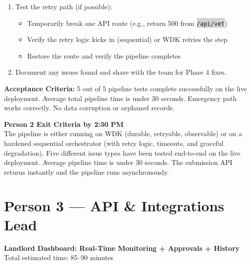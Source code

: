 \documentclass[11pt, a4paper]{article}
\newcommand{\code}[1]{\texttt{\small\colorbox{lightgray}{#1}}}
\begin{document}
\begin{enumerate}[leftmargin=2em, itemsep=2pt]
  \item Test the retry path (if possible):
    \begin{itemize}[itemsep=1pt]
      \item Temporarily break one API route (e.g., return 500 from \code{/api/vet})
      \item Verify the retry logic kicks in (sequential) or WDK retries the step
      \item Restore the route and verify the pipeline completes
    \end{itemize}

  \item Document any issues found and share with the team for Phase 4 fixes.
\end{enumerate}

\textbf{Acceptance Criteria:} 5 out of 5 pipeline tests complete successfully on the live deployment. Average total pipeline time is under 30 seconds. Emergency path works correctly. No data corruption or orphaned records.

\vspace{0.5em}

\begin{milestonebox}
\textbf{Person 2 Exit Criteria by 2:30 PM}\\[4pt]
The pipeline is either running on WDK (durable, retryable, observable) or on a hardened sequential orchestrator (with retry logic, timeouts, and graceful degradation). Five different issue types have been tested end-to-end on the live deployment. Average pipeline time is under 30 seconds. The submission API returns instantly and the pipeline runs asynchronously.
\end{milestonebox}

\newpage

\section{Person 3 --- API \& Integrations Lead}
\begin{center}
\textcolor{medpurple}{\large\textbf{Landlord Dashboard: Real-Time Monitoring + Approvals + History}}\\[2pt]
\textcolor{textmuted}{\small Total estimated time: 85--90 minutes}
\end{center}

\vspace{0.5em}
\end{document}

